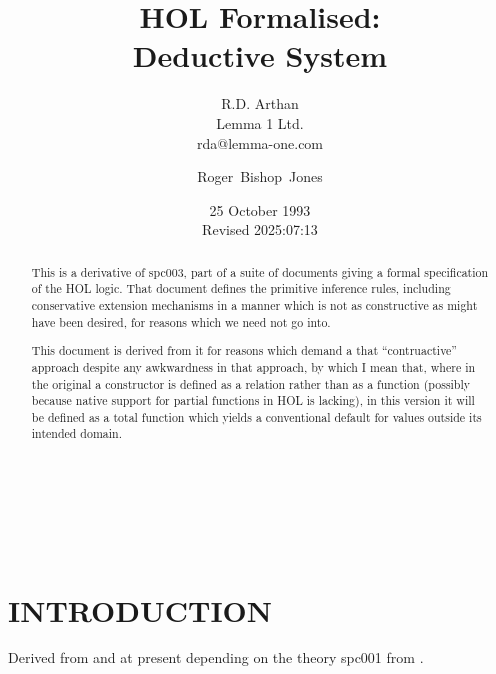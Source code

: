\documentclass[a4paper,11pt,titlepage]{article}
\title{{\bf HOL Formalised: \\ Deductive System}}  %
\author{R.D. Arthan \\ Lemma 1 Ltd. \\ rda@lemma-one.com}
\date{25 October 1993 \\ Revised \FormatDate{\VCDate}}
\title{\LARGE\bf }
\author{Roger~Bishop~Jones}
\date{\small 2025:07:13}
\newcommand{\ignore}[1]{}
\begin{document}
\begin{titlepage}
\maketitle
\begin{abstract}
This is a derivative of spc003, part of a suite of documents giving
a formal specification of the HOL logic.
That document defines the primitive inference rules, including conservative extension mechanisms in a manner which is not as constructive as might have been desired, for reasons which we need not go into.

This document is derived from it for reasons which demand a that ``contruactive'' approach despite any awkwardness in that approach, by which I mean that, where in the original a constructor is defined as a relation rather than as a function (possibly because native support for partial functions in HOL is lacking), in this version it will be defined as a total function which yields a conventional default for values outside its intended domain.

\end{abstract}
\vfill           
\begin{titlepage}
\maketitle





\end{titlepage}

\ \

\ignore{
\begin{centering}
{}
\end{centering}
}%

\setcounter{tocdepth}{2}
{\parskip-0pt\tableofcontents}

\           

\section{INTRODUCTION}

Derived from \cite{DS/FMU/IED/SPC003} and at present depending on the theory spc001 from \cite{DS/FMU/IED/SPC001}.


\end{titlepage}
\end{document}
